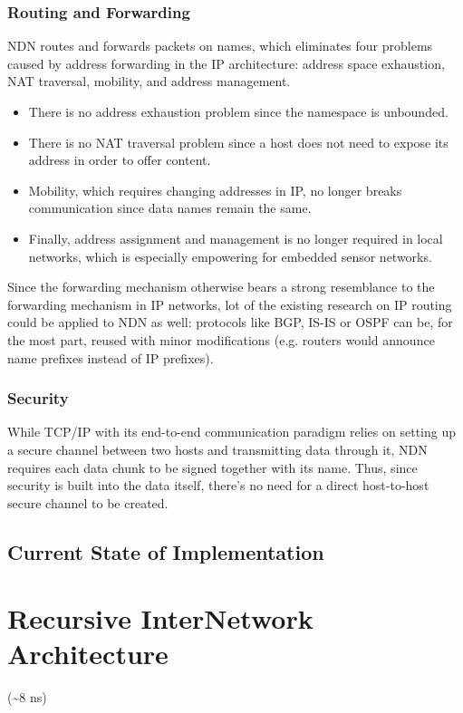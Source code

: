         \subsection{Routing and Forwarding}
            NDN routes and forwards packets on names, which eliminates four problems caused by address forwarding in the IP architecture: address space exhaustion, NAT traversal, mobility, and address management.
            \begin{itemize}
                \item There is no address exhaustion problem since the namespace is unbounded.
                \item There is no NAT traversal problem since a host does not need to expose its address in order to offer content.
                \item Mobility, which requires changing addresses in IP, no longer breaks communication since data names remain the same.
                \item Finally, address assignment and management is no longer required in local networks, which is especially empowering for embedded sensor networks.
            \end{itemize}

            Since the forwarding mechanism otherwise bears a strong resemblance to the forwarding mechanism in IP networks, lot of the existing research on IP routing could be applied to NDN as well: protocols like BGP, IS-IS or OSPF can be, for the most part, reused with minor modifications (e.g. routers would announce name prefixes instead of IP prefixes).

        \subsection{Security}
            While TCP/IP with its end-to-end communication paradigm relies on setting up a secure channel between two hosts and transmitting data through it, NDN requires each data chunk to be signed together with its name. Thus, since security is built into the data itself, there's no need for a direct host-to-host secure channel to be created.

    \section{Current State of Implementation}

\chapter{Recursive InterNetwork Architecture}
    (\textasciitilde8 ns)
